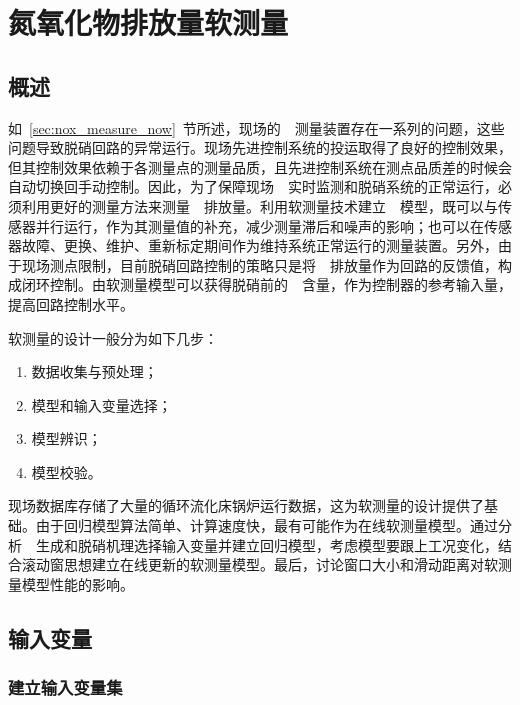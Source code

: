 \chapter{氮氧化物排放量软测量}
\label{chap:softsensor}
\section{概述}

如~\ref{sec:nox_measure_now}~节所述，现场的~~测量装置存在一系列的问题，这些问题导致脱硝回路的异常运行。现场先进控制系统的投运取得了良好的控制效果，但其控制效果依赖于各测量点的测量品质，且先进控制系统在测点品质差的时候会自动切换回手动控制。因此，为了保障现场~~实时监测和脱硝系统的正常运行，必须利用更好的测量方法来测量~~排放量。利用软测量技术建立~~模型，既可以与传感器并行运行，作为其测量值的补充，减少测量滞后和噪声的影响；也可以在传感器故障、更换、维护、重新标定期间作为维持系统正常运行的测量装置。另外，由于现场测点限制，目前脱硝回路控制的策略只是将~~排放量作为回路的反馈值，构成闭环控制。由软测量模型可以获得脱硝前的~~含量，作为控制器的参考输入量，提高回路控制水平。

软测量的设计一般分为如下几步\cite{Fortuna2007Soft}：
\begin{enumerate}
\item {数据收集与预处理；}
\item {模型和输入变量选择；}
\item {模型辨识；}
\item {模型校验。}
\end{enumerate}

现场数据库存储了大量的循环流化床锅炉运行数据，这为软测量的设计提供了基础。由于回归模型算法简单、计算速度快，最有可能作为在线软测量模型。通过分析~~生成和脱硝机理选择输入变量并建立回归模型，考虑模型要跟上工况变化，结合滚动窗思想建立在线更新的软测量模型。最后，讨论窗口大小和滑动距离对软测量模型性能的影响。


\section{输入变量}
\subsection{建立输入变量集}

